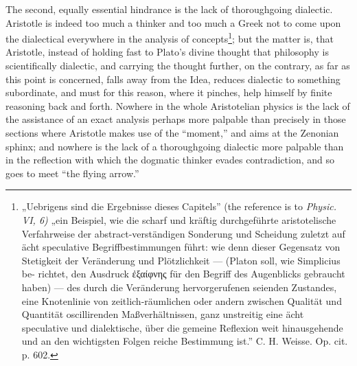 \documentclass[12pt,a4paper,openany]{book}
\newcommand{\opage}[1]{\marginnote{\footnotesize\textit{[#1]}}}
\begin{document}
The second, equally essential hindrance is the lack of thoroughgoing dialectic. Aristotle is indeed too much a thinker and too much a Greek not to come upon the dialectical everywhere in the analysis of concepts\footnote[2]{„Uebrigens sind die Ergebnisse dieses Capitels'' (the reference is to \textit{Physic. VI, 6)} „ein Beispiel, wie die scharf und kräftig durchgeführte aristotelische Verfahrweise der abstract-verständigen Sonderung und Scheidung zuletzt auf ächt speculative Begriffbestimmungen führt: wie denn dieser Gegensatz von Stetigkeit der Veränderung und Plötzlichkeit — (Platon soll, wie Simplicius be- richtet, den Ausdruck ἐξαίφνης für den Begriff des Augenblicks gebraucht haben) — des durch die Veränderung hervorgerufenen seienden Zustandes, eine Knotenlinie von zeitlich-räumlichen oder andern zwischen Qualität und Quantität oscillirenden Maßverhältnissen, ganz unstreitig eine ächt speculative und dialektische, über die gemeine Reflexion weit hinausgehende und an den wichtigsten Folgen reiche Bestimmung ist.'' C. H. Weisse. Op. cit. p. 602.}; but the matter is,
\setcounter{footnote}{0}%
\opage{140}that Aristotle, instead of holding fast to Plato's divine thought that philosophy is scientifically dialectic, and carrying the thought further, on the contrary, as far as this point is concerned, falls away from the Idea, reduces dialectic to something subordinate, and must for this reason, where it pinches, help himself by finite reasoning back and forth. Nowhere in the whole Aristotelian physics is the lack of the assistance of an exact analysis perhaps more palpable than precisely in those sections where Aristotle makes use of the ``moment,'' and aims at the Zenonian sphinx; and nowhere is the lack of a thoroughgoing dialectic more palpable than in the reflection with which the dogmatic thinker evades contradiction, and so goes to meet ``the flying arrow.''
\end{document}
